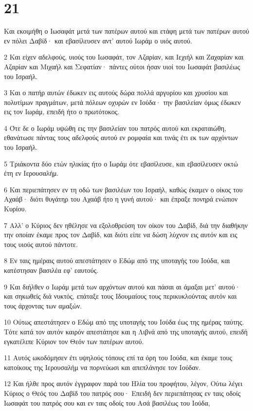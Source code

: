\chapter{21}

\par Και εκοιμήθη ο Ιωσαφάτ μετά των πατέρων αυτού και ετάφη μετά των πατέρων αυτού εν πόλει Δαβίδ· και εβασίλευσεν αντ' αυτού Ιωράμ ο υιός αυτού.
\par 2 Και είχεν αδελφούς, υιούς του Ιωσαφάτ, τον Αζαρίαν, και Ιεχιήλ και Ζαχαρίαν και Αζαρίαν και Μιχαήλ και Σεφατίαν· πάντες ούτοι ήσαν υιοί του Ιωσαφάτ βασιλέως του Ισραήλ.
\par 3 Και ο πατήρ αυτών έδωκεν εις αυτούς δώρα πολλά αργυρίου και χρυσίου και πολυτίμων πραγμάτων, μετά πόλεων οχυρών εν Ιούδα· την βασιλείαν όμως έδωκεν εις τον Ιωράμ, επειδή ήτο ο πρωτότοκος.
\par 4 Ότε δε ο Ιωράμ υψώθη εις την βασιλείαν του πατρός αυτού και εκραταιώθη, εθανάτωσε πάντας τους αδελφούς αυτού εν ρομφαία και τινάς έτι εκ των αρχόντων του Ισραήλ.
\par 5 Τριάκοντα δύο ετών ηλικίας ήτο ο Ιωράμ ότε εβασίλευσε, και εβασίλευσεν οκτώ έτη εν Ιερουσαλήμ.
\par 6 Και περιεπάτησεν εν τη οδώ των βασιλέων του Ισραήλ, καθώς έκαμεν ο οίκος του Αχαάβ· διότι θυγάτηρ του Αχαάβ ήτο η γυνή αυτού· και έπραξε πονηρά ενώπιον Κυρίου.
\par 7 Αλλ' ο Κύριος δεν ηθέλησε να εξολοθρεύση τον οίκον του Δαβίδ, διά την διαθήκην την οποίαν έκαμε προς τον Δαβίδ, και διότι είπε να δώση λύχνον εις αυτόν και εις τους υιούς αυτού πάντοτε.
\par 8 Εν ταις ημέραις αυτού απεστάτησεν ο Εδώμ από της υποταγής του Ιούδα, και κατέστησαν βασιλέα εφ' εαυτούς.
\par 9 Και διήλθεν ο Ιωράμ μετά των αρχόντων αυτού και πάσαι αι άμαξαι μετ' αυτού· και σηκωθείς διά νυκτός, επάταξε τους Ιδουμαίους τους περικυκλούντας αυτόν και τους άρχοντας των αμαξών.
\par 10 Ούτως απεστάτησεν ο Εδώμ από της υποταγής του Ιούδα έως της ημέρας ταύτης. Τότε κατά τον αυτόν καιρόν απεστάτησε και η Λιβνά από της υποταγής αυτού, επειδή εγκατέλιπε Κύριον τον Θεόν των πατέρων αυτού.
\par 11 Αυτός ωκοδόμησεν έτι υψηλούς τόπους επί τα όρη του Ιούδα, και έκαμε τους κατοίκους της Ιερουσαλήμ να πορνεύωσι και απεπλάνησε τον Ιούδαν.
\par 12 Και ήλθε προς αυτόν έγγραφον παρά του Ηλία του προφήτου, λέγον, Ούτω λέγει Κύριος ο Θεός του Δαβίδ του πατρός σου· Επειδή δεν περιεπάτησας εν ταις οδοίς Ιωσαφάτ του πατρός σου και εν ταις οδοίς του Ασά βασιλέως του Ιούδα,
